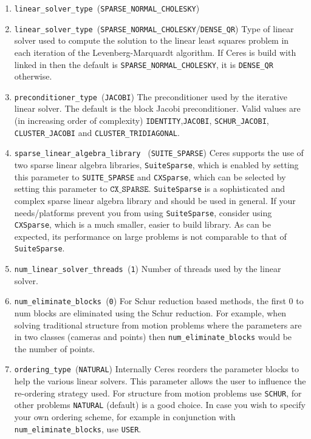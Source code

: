 \begin{enumerate}
\item{\texttt{linear\_solver\_type }(\texttt{SPARSE\_NORMAL\_CHOLESKY})}

\item{\texttt{linear\_solver\_type
    }}(\texttt{SPARSE\_NORMAL\_CHOLESKY}/\texttt{DENSE\_QR}) Type of
  linear solver used to compute the solution to the linear least
  squares problem in each iteration of the Levenberg-Marquardt
  algorithm. If Ceres is build with \suitesparse linked in  then the
  default is \texttt{SPARSE\_NORMAL\_CHOLESKY}, it is
  \texttt{DENSE\_QR} otherwise.

\item{\texttt{preconditioner\_type }}(\texttt{JACOBI}) The
  preconditioner used by the iterative linear solver. The default is
  the block Jacobi preconditioner. Valid values are (in increasing
  order of complexity) \texttt{IDENTITY},\texttt{JACOBI},
  \texttt{SCHUR\_JACOBI}, \texttt{CLUSTER\_JACOBI} and
  \texttt{CLUSTER\_TRIDIAGONAL}.

\item{\texttt{sparse\_linear\_algebra\_library }
    (\texttt{SUITE\_SPARSE})} Ceres supports the use of two sparse
  linear algebra libraries, \texttt{SuiteSparse}, which is enabled by
  setting this parameter to \texttt{SUITE\_SPARSE} and
  \texttt{CXSparse}, which can be selected by setting this parameter
  to $\texttt{CX\_SPARSE}$. \texttt{SuiteSparse} is a sophisticated
  and complex sparse linear algebra library and should be used in
  general. If your needs/platforms prevent you from using
  \texttt{SuiteSparse}, consider using \texttt{CXSparse}, which is a
  much smaller, easier to build library. As can be expected, its
  performance on large problems is not comparable to that of
  \texttt{SuiteSparse}.


\item{\texttt{num\_linear\_solver\_threads }}(\texttt{1}) Number of
  threads used by the linear solver.

\item{\texttt{num\_eliminate\_blocks }}(\texttt{0})
For Schur reduction based methods, the first 0 to num blocks are
eliminated using the Schur reduction. For example, when solving
traditional structure from motion problems where the parameters are in
two classes (cameras and points) then \texttt{num\_eliminate\_blocks}
would be the number of points.

\item{\texttt{ordering\_type }}(\texttt{NATURAL}) Internally Ceres
  reorders the parameter blocks to help the various linear
  solvers. This parameter allows the user to influence the re-ordering
  strategy used. For structure from motion problems use
  \texttt{SCHUR}, for other problems \texttt{NATURAL} (default) is a
  good choice. In case you wish to specify your own ordering scheme,
  for example in conjunction with \texttt{num\_eliminate\_blocks}, use
  \texttt{USER}.


\end{enumerate}
